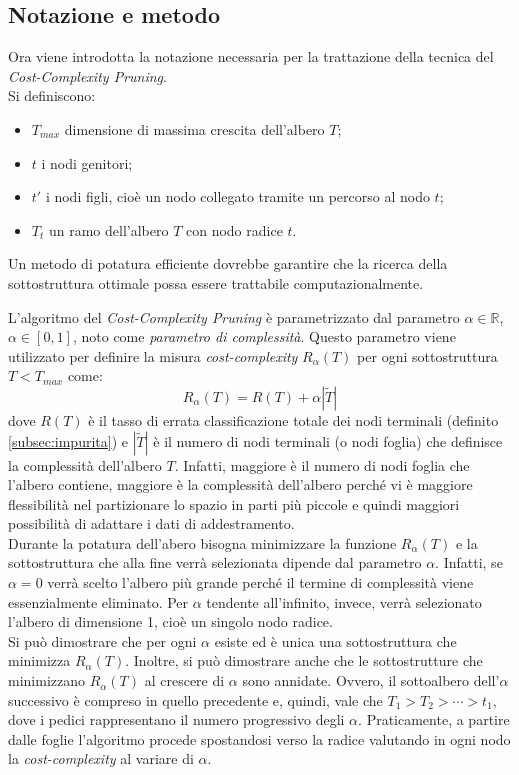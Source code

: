 \subsection{Notazione e metodo}
Ora viene introdotta la notazione necessaria per la trattazione della tecnica del \textit{Cost-Complexity Pruning}.\\
Si definiscono:
\begin{itemize}
    \item $T_{max}$ dimensione di massima crescita dell'albero $T$;
    \item $t$ i nodi genitori;
    \item $t'$ i nodi figli, cioè un nodo collegato tramite un percorso al nodo $t$;
    \item $T_{t}$ un ramo dell'albero $T$ con nodo radice $t$.
\end{itemize}
Un metodo di potatura efficiente dovrebbe garantire che la ricerca della sottostruttura ottimale possa essere trattabile computazionalmente.

L'algoritmo del \textit{Cost-Complexity Pruning} è parametrizzato dal parametro $\alpha \in \mathbb{R}$, $\alpha \in[0,1]$, noto come \textit{parametro di complessità}. Questo parametro viene utilizzato per definire la misura \textit{cost-complexity} $R_{\alpha}(T)$ per ogni sottostruttura $T<T_{max}$ come:
\begin{equation}
R_{\alpha}(T)=R(T)+\alpha|\tilde{T}|
\label{eq:costcompl}
\end{equation}
dove $R(T)$ è il tasso di errata classificazione totale dei nodi terminali (definito \ref{subsec:impurita}) e $|\tilde{T}|$ è il numero di nodi terminali (o nodi foglia) che definisce la complessità dell'albero $T$. Infatti, maggiore è il numero di nodi foglia che l'albero contiene, maggiore è la complessità dell'albero perché vi è maggiore flessibilità nel partizionare lo spazio in parti più piccole e quindi maggiori possibilità di adattare i dati di addestramento.\\
Durante la potatura dell'abero bisogna minimizzare la funzione $R_{\alpha}(T)$ e la sottostruttura che alla fine verrà selezionata dipende dal parametro $\alpha$. Infatti, se $\alpha=0$ verrà scelto l'albero più grande perché il termine di complessità viene essenzialmente eliminato. Per $\alpha$ tendente all'infinito, invece, verrà selezionato l'albero di dimensione 1, cioè un singolo nodo radice.\\
Si può dimostrare \cite{split:online} che per ogni $\alpha$ esiste ed è unica una sottostruttura che minimizza $R_{\alpha}(T)$. Inoltre, si può dimostrare anche che le sottostrutture che minimizzano $R_{\alpha}(T)$ al crescere di $\alpha$ sono annidate. Ovvero, il sottoalbero dell'$\alpha$ successivo è compreso in quello precedente e, quindi, vale che $T_{1}>T_{2}>\cdots>t_{1}$, dove i pedici rappresentano il numero progressivo degli $\alpha$. Praticamente, a partire dalle foglie l'algoritmo procede spostandosi verso la radice valutando in ogni nodo la \textit{cost-complexity} al variare di $\alpha$.

